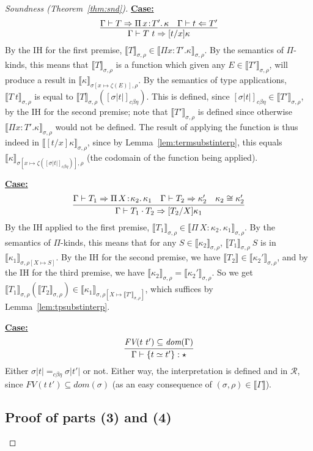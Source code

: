 \documentclass{article}
\newcommand{\choice}[0]{\zeta}
\newcommand{\abs}[4]{{#1}\, #2\! : \! #3.\, #4}
\newcommand{\interp}[1]{\llbracket #1 \rrbracket}
\newcommand{\tpcheck}[0]{\Leftarrow}
\newcommand{\tpsynth}[0]{\Rightarrow}
\newcommand{\cbe}[0]{c\beta\eta}
\newcommand{\startcase}[1]{\vspace{#1} \noindent\textbf{\underline{Case:}}}
\begin{document}
\begin{proof}[Soundness (Theorem~\ref{thm:snd})]
\startcase{.2cm}
\[
   \infer{\Gamma\vdash T\ t \tpsynth [t/x]\kappa}{\Gamma\vdash T \tpsynth \abs{\Pi}{x}{T'}{\kappa} & \Gamma\vdash t \tpcheck T'} 
\]
By the IH for the first premise,
$\interp{T}_{\sigma,\rho}\in\interp{\Pi x:T'.\kappa}_{\sigma,\rho}$.
By the semantics of $\Pi$-kinds, this means that
$\interp{T}_{\sigma,\rho}$ is a function which given any
$E\in\interp{T'}_{\sigma,\rho}$, will produce a result in
$\interp{\kappa}_{\sigma[x\mapsto \choice(E)],\rho}$.  By the
semantics of type applications, $\interp{T\ t}_{\sigma,\rho}$ is equal
to $\interp{T}_{\sigma,\rho}([\sigma |t|]_{\cbe})$.  This is defined,
since $[\sigma |t|]_{\cbe}\in\interp{T'}_{\sigma,\rho}$, by the IH for
the second premise; note that $\interp{T'}_{\sigma,\rho}$ is defined
since otherwise $\interp{\Pi x:T'.\kappa}_{\sigma,\rho}$ would not be defined.
The result of applying the function is thus indeed
in $\interp{[t/x]\kappa}_{\sigma,\rho}$, since by
Lemma~\ref{lem:termsubstinterp}, this equals
$\interp{\kappa}_{\sigma[x\mapsto \choice([\sigma |t|]_{\cbe})],\rho}$
(the codomain of the function being applied).

\startcase{.2cm}
\[
  \infer{\Gamma\vdash T_1 \cdot T_2 \tpsynth [T_2/X]\kappa_1}{\Gamma\vdash T_1 \tpsynth \abs{\Pi}{X}{\kappa_2}{\kappa_1} & \Gamma\vdash T_2 \tpsynth \kappa_2' & \kappa_2 \cong \kappa_2'}
\]
By the IH applied to the first premise,
$\interp{T_1}_{\sigma,\rho}\in\interp{\abs{\Pi}{X}{\kappa_2}{\kappa_1}}_{\sigma,\rho}$.
By the semantics of $\Pi$-kinds, this means that for any
$S\in\interp{\kappa_2}_{\sigma,\rho}$, $\interp{T_1}_{\sigma,\rho}\ S$ is in
$\interp{\kappa_1}_{\sigma,\rho[X\mapsto S]}$.  By the IH for the second premise, we have 
$\interp{T_2} \in \interp{\kappa_2'}_{\sigma,\rho}$, and by the IH for the third premise,
we have $\interp{\kappa_2}_{\sigma,\rho} = \interp{\kappa_2'}_{\sigma,\rho}$.  So
we get $\interp{T_1}_{\sigma,\rho}(\interp{T_2}_{\sigma,\rho})\in \interp{\kappa_1}_{\sigma,\rho[X\mapsto \interp{T'}_{\sigma,\rho}]}$,
which suffices by Lemma~\ref{lem:tpsubstinterp}.

\startcase{.2cm}
\[
    \infer{\Gamma\vdash \{ t \simeq t' \} : \star}{\textit{FV}(t\ t')\subseteq\textit{dom}(\Gamma)}
\]
Either $\sigma |t| =_{\cbe} \sigma |t'|$ or not.  Either way, the interpretation is defined and in $\mathcal{R}$, since
$\textit{FV}(t\ t')\subseteq\textit{dom}(\sigma)$ (as an easy consequence of $(\sigma,\rho)\in\interp{\Gamma}$).

\subsection{Proof of parts (3) and (4)}


\end{proof}
\end{document}

